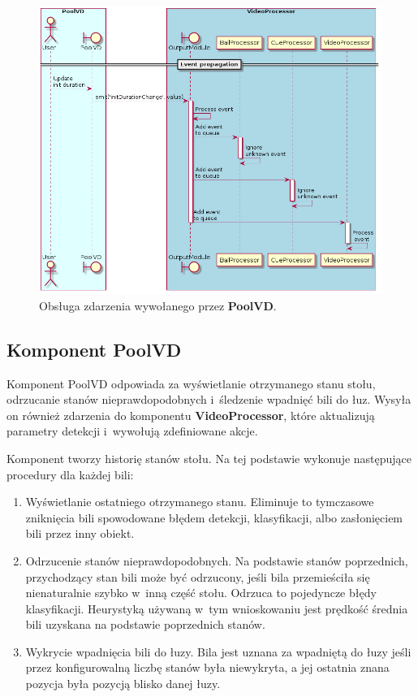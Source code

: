 \documentclass[12pt]{article}
\begin{document}
\begin{figure}[!htb]
    \centering
    \includegraphics[width=15cm]{./diagrams/out/pool_vd_events_sd.png}
    \caption{Obsługa zdarzenia wywołanego przez \textbf{PoolVD}.}
    \label{pool_vd_events_sd}
\end{figure}

\subsection{Komponent PoolVD}
Komponent PoolVD odpowiada za wyświetlanie otrzymanego stanu stołu, odrzucanie stanów nieprawdopodobnych i~śledzenie wpadnięć bili do łuz. Wysyła on również zdarzenia do komponentu \textbf{VideoProcessor}, które aktualizują parametry detekcji i~wywołują zdefiniowane akcje.

Komponent tworzy historię stanów stołu. Na tej podstawie wykonuje następujące procedury dla każdej bili:

\begin{enumerate} [noitemsep]
    \item Wyświetlanie ostatniego otrzymanego stanu. Eliminuje to tymczasowe zniknięcia bili spowodowane błędem detekcji, klasyfikacji, albo zasłonięciem bili przez inny obiekt.
    \item Odrzucenie stanów nieprawdopodobnych. Na podstawie stanów poprzednich, przychodzący stan bili może być odrzucony, jeśli bila przemieściła się nienaturalnie szybko w~inną część stołu. Odrzuca to pojedyncze błędy klasyfikacji. Heurystyką używaną w~tym wnioskowaniu jest prędkość średnia bili uzyskana na podstawie poprzednich stanów.
    \item Wykrycie wpadnięcia bili do łuzy. Bila jest uznana za wpadniętą do łuzy jeśli przez konfigurowalną liczbę stanów była niewykryta, a jej ostatnia znana pozycja była pozycją blisko danej łuzy.
\end{enumerate}
\end{document}

